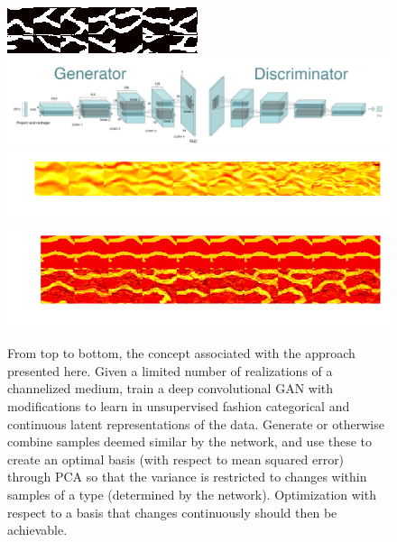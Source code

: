 \documentclass{article}
\begin{document}
\begin{figure}[h]
\centering
  \includegraphics[]{figures/smallOptSnapshots_32.png}
  \includegraphics[width=\linewidth,scale=0.2]{figures/1_39Nnni_nhPDaLu9AnTLoWw.png}
  \includegraphics[]{figures/GeneratedSnapshots_Modes.png}
  \includegraphics[]{figures/GeneratedSnapshots_KDESamples100.png}
  \caption{From top to bottom, the concept associated with the approach presented here.  Given a limited number of realizations of a channelized medium, train a deep convolutional GAN with modifications to learn in unsupervised fashion categorical and continuous latent representations of  the data.  Generate or otherwise combine samples deemed similar by the network, and use these to create an optimal basis (with respect to mean squared error) through PCA so that the variance is restricted to changes within samples of a type (determined by the network).  Optimization with respect to a basis that changes continuously should then be achievable. }
\end{figure}\label{GenPCA2}
\end{document}
